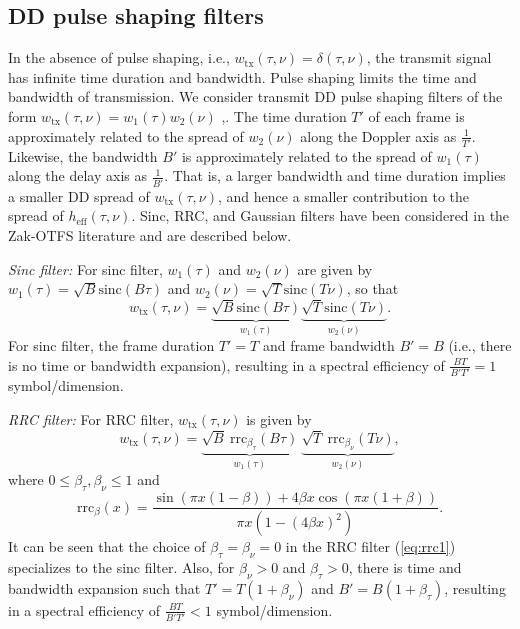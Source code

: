 \vspace{-2mm}
\subsection{DD pulse shaping filters}
In the absence of pulse shaping, i.e., $w_\text{tx}(\tau,\nu)=\delta(\tau,\nu)$, the transmit signal has infinite time duration and bandwidth. Pulse shaping limits the time and bandwidth of transmission. We consider transmit DD pulse shaping filters of the form $w_\text{tx}(\tau,\nu)=w_1(\tau)w_2(\nu)$ \cite{zak_otfs2},\cite{zak_otfs6}. The time duration $T'$ of each frame is approximately related to the spread of $w_2({\nu})$ along the Doppler axis as $\frac{1}{T'}$. Likewise, the bandwidth $B'$ is approximately related to the spread of $w_1(\tau)$ along the delay axis as $\frac{1}{B'}$. That is, a larger bandwidth and time duration implies a smaller DD spread of $w_\text{tx}(\tau,\nu)$, and hence a smaller contribution to the spread of $h_\text{eff}(\tau,\nu)$. Sinc, RRC, and Gaussian filters have been considered in the Zak-OTFS literature and are described below. 

{\em Sinc filter:}
For sinc filter, $w_1({\tau})$ and $w_2({\nu})$ are given by
$w_1({\tau}) = \sqrt{B}\text{sinc}(B\tau)$ and $w_2({\nu}) = \sqrt{T}\text{sinc}(T\nu)$,
so that 
\begin{equation}
w_\text{tx}(\tau,\nu)
=\underbrace{\sqrt{B}\text{sinc}(B\tau)}_{w_1(\tau)} \underbrace{\sqrt{T}\text{sinc}(T\nu)}_{w_2(\nu)}. 
\label{eq:sinc1}
\end{equation}
For sinc filter, the frame duration $T'=T$ and frame bandwidth $B'=B$ (i.e., there is no time or bandwidth expansion), resulting in a spectral efficiency of $\frac{BT}{B'T'}=1$ symbol/dimension. 

{\em RRC filter:}
For RRC filter, $w_\text{tx}(\tau,\nu)$ is given by
\begin{equation}
w_\text{tx}(\tau,\nu) = \underbrace{\sqrt{B} \ \text{rrc}_{\beta_\tau}(B\tau)}_{w_1(\tau)} \ \underbrace{\sqrt{T} \ \text{rrc}_{\beta_\nu}(T\nu)}_{w_2(\nu)},
\label{eq:rrc1}
\end{equation}
where $0\leq \beta_{\tau},\beta_\nu \leq 1$ and
\begin{equation}
\text{rrc}_{\beta}(x)=\frac{\sin \left(\pi x(1-\beta) \right)+4\beta x\cos \left(\pi x(1+\beta) \right)}{\pi x \left(1-(4\beta x)^2 \right)}. 
\end{equation}
It can be seen that the choice of $\beta_\tau=\beta_\nu=0$ in the RRC filter (\ref{eq:rrc1}) specializes to the sinc filter. Also, for $\beta_\nu>0$ and $\beta_\tau>0$, there is time and bandwidth expansion such that  $T'=T(1+\beta_{\nu})$ and $B'=B(1+\beta_{\tau})$, resulting in a spectral efficiency of $\frac{BT}{B'T'}<1$ symbol/dimension. 

